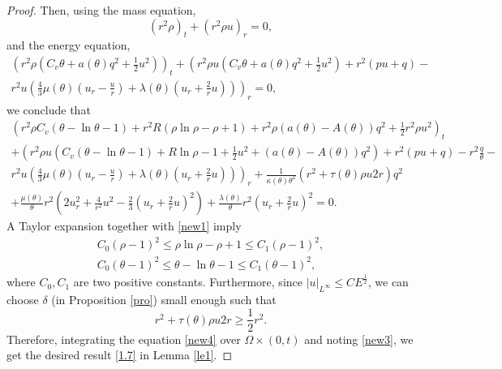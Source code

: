 \documentclass[11pt,reqno]{amsart}
\numberwithin{equation}{section}
\begin{document}
\begin{proof}
Then, using the mass equation,
\[
(r^2 \rho)_t+(r^2 \rho u)_r=0,
\]
and the energy equation,
\begin{align*}
\left( r^2 \rho (C_v \theta+a(\theta) q^2+\frac{1}{2}u^2) \right)_t +\left( r^2 \rho u \left( C_v\theta+a(\theta) q^2+\frac{1}{2}u^2\right)+r^2(pu+q)-\right.\\
\left.r^2 u \left( \frac{4}{3} \mu(\theta) (u_r-\frac{u}{r})+\lambda(\theta)(u_r+\frac{2}{r} u) \right)\right)_r=0,
\end{align*}
we conclude that{\small
\begin{align}
\left( r^2 \rho  C_v(\theta-\ln \theta-1)+r^2 R(\rho \ln \rho-\rho+1)+r^2 \rho (a(\theta)-A(\theta) )q^2+\frac{1}{2}r^2 \rho  u^2 \right)_t \nonumber \\
+\left( r^2 \rho u \left( C_v(\theta- \ln \theta-1)+R\ln \rho-1+\frac{1}{2}u^2+(a(\theta)-A(\theta) )q^2\right)+r^2(pu+q)-r^2\frac{q}{\theta}-\right. \nonumber\\
\left.r^2 u \left( \frac{4}{3} \mu(\theta) (u_r-\frac{u}{r})+\lambda(\theta)(u_r+\frac{2}{r} u) \right)\right)_r
+\frac{1}{\kappa(\theta) \theta^2} \left(r^2+\tau(\theta) \rho u 2 r \right) q^2 \nonumber\\
+ \frac{\mu(\theta)}{\theta} r^2 \left( 2u_r^2+\frac{4}{r^2}u^2-\frac{2}{3} \left(u_r+\frac{2}{r} u\right)^2\right)+\frac{\lambda (\theta)}{\theta} r^2 \left(u_r+\frac{2}{r} u\right)^2 =0. \label{new4}
\end{align}}
A Taylor expansion together with \eqref{new1} imply
\begin{align}
C_0(\rho-1)^2 \le \rho \ln \rho -\rho+1 \le C_1 (\rho-1)^2,\\
C_0 (\theta-1)^2 \le \theta-\ln \theta-1 \le C_1 (\theta-1)^2,
\end{align}
where $C_0, C_1$ are two positive constants. Furthermore, since $|u|_{L^\infty} \le C E^\frac{1}{2}$, we can choose $\delta$  (in Proposition \ref{pro})
small enough such that
\[
r^2+\tau(\theta) \rho u 2 r \ge \frac{1}{2} r^2.
\]
Therefore, integrating the equation \eqref{new4} over  $\Omega \times (0,t)$ and noting \eqref{new3}, we get the desired result  \eqref{1.7} in Lemma \ref{le1}.
\end{proof}
\end{document}
